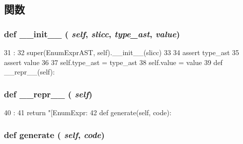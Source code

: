 \subsection{関数}
\hypertarget{classslicc_1_1ast_1_1EnumExprAST_1_1EnumExprAST_ac775ee34451fdfa742b318538164070e}{
\subsubsection[{\_\-\_\-init\_\-\_\-}]{\setlength{\rightskip}{0pt plus 5cm}def \_\-\_\-init\_\-\_\- ( {\em self}, \/   {\em slicc}, \/   {\em type\_\-ast}, \/   {\em value})}}
\label{classslicc_1_1ast_1_1EnumExprAST_1_1EnumExprAST_ac775ee34451fdfa742b318538164070e}



\begin{DoxyCode}
31                                               :
32         super(EnumExprAST, self).__init__(slicc)
33 
34         assert type_ast
35         assert value
36 
37         self.type_ast = type_ast
38         self.value = value
39 
    def __repr__(self):
\end{DoxyCode}
\hypertarget{classslicc_1_1ast_1_1EnumExprAST_1_1EnumExprAST_ad8b9328939df072e4740cd9a63189744}{
\subsubsection[{\_\-\_\-repr\_\-\_\-}]{\setlength{\rightskip}{0pt plus 5cm}def \_\-\_\-repr\_\-\_\- ( {\em self})}}
\label{classslicc_1_1ast_1_1EnumExprAST_1_1EnumExprAST_ad8b9328939df072e4740cd9a63189744}



\begin{DoxyCode}
40                       :
41         return "[EnumExpr: %
42 
    def generate(self, code):
\end{DoxyCode}
\hypertarget{classslicc_1_1ast_1_1EnumExprAST_1_1EnumExprAST_a4555d1cee0dccf3942ea35fe86de2e8e}{
\subsubsection[{generate}]{\setlength{\rightskip}{0pt plus 5cm}def generate ( {\em self}, \/   {\em code})}}
\label{classslicc_1_1ast_1_1EnumExprAST_1_1EnumExprAST_a4555d1cee0dccf3942ea35fe86de2e8e}



